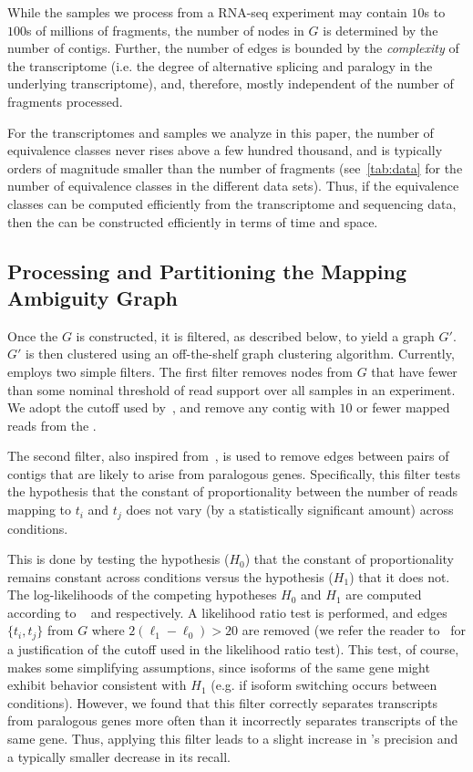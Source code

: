 While the samples we process from a \denovo RNA-seq experiment may contain $10$s to $100$s of millions of fragments, the number of nodes in $G$ is determined by the number of contigs.  Further, the number of edges is bounded by the \textit{complexity} of the transcriptome (i.e. the degree of alternative splicing and paralogy in the underlying transcriptome), and, therefore, mostly independent of the number of fragments processed. 

For the transcriptomes and samples we analyze in this paper, the number of equivalence classes never rises above a few hundred thousand, and is typically orders of magnitude smaller than the number of fragments (see~\ref{tab:data} for the number of equivalence classes in the different data sets).  Thus, if the equivalence classes can be computed efficiently from the transcriptome and sequencing data, then the \ambiggraph can be constructed efficiently in terms of time and space.

\subsection{Processing and Partitioning the Mapping Ambiguity Graph}
\label{sec:mag_filter}

Once the \ambiggraph $G$ is constructed, it is filtered, as described below, to yield a graph $G'$.  $G'$ is then clustered using an off-the-shelf graph clustering algorithm.  Currently, \rapclust employs two simple filters. The first filter removes nodes from $G$ that have fewer than some nominal threshold of read support over all samples in an experiment. We adopt the cutoff used by~\citep{corset}, and remove any contig with $10$ or fewer mapped reads from the \ambiggraph.  

The second filter, also inspired from~\citep{corset}, is used to remove edges between pairs of contigs that are likely to arise from paralogous genes.  Specifically, this filter tests the hypothesis that the constant of proportionality between the number of reads mapping to $t_i$ and $t_j$ does not vary (by a statistically significant amount) across conditions. 

This is done by testing the hypothesis ($H_0$) that the constant of proportionality remains constant across conditions versus the hypothesis  ($H_1$) that it does not. The log-likelihoods of the competing hypotheses $H_0$ and $H_1$ are computed according to ~ and  respectively. A likelihood ratio test is performed, and edges $\{t_i, t_j\}$ from $G$ where $2 \left(\ell_1 - \ell_0\right) > 20$ are removed (we refer the reader to~\citep{corset} for a justification of the cutoff used in the likelihood ratio test).  This test, of course, makes some simplifying assumptions, since isoforms of the same gene might exhibit behavior consistent with $H_1$ (e.g. if isoform switching occurs between conditions).  However, we found that this filter correctly separates transcripts from paralogous genes more often than it incorrectly separates transcripts of the same gene.  Thus, applying this filter leads to a slight increase in \rapclust's precision and a typically smaller decrease in its recall.

